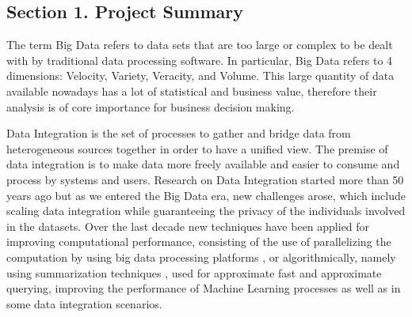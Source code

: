 \documentclass[12pt]{article}
\begin{document}


\subsection*{Section 1. Project Summary}
The term Big Data refers to data sets that are too large or complex to be dealt with by traditional data processing software. 
In particular, Big Data refers to 4 dimensions: Velocity, Variety, Veracity, and Volume. This large quantity of data available nowadays has 
a lot of statistical and business value, therefore their analysis is of core importance for business decision making.

Data Integration is the set of processes to gather and bridge data from heterogeneous sources together in order to 
have a unified view. The premise of data integration is to make data more freely available and easier 
to consume and process by systems and users.
Research on Data Integration started more than 50 years ago \cite*{recordLinkTheory,dataModelIntegration1980} but as we entered the Big Data era, new challenges arose,
 which include scaling \cite*{Dong2013} data integration while guaranteeing the privacy \cite*{yu2016big} of the individuals involved in the datasets.
Over the last decade new techniques have been applied for improving computational performance, consisting of the use of parallelizing the computation by using big data processing platforms \cite*{Dong2013},
 or algorithmically, namely using summarization techniques \cite*{Cormode2011}, used for 
approximate fast and approximate querying, improving the performance of Machine Learning processes \cite*{Gribonval2020, Antonanzas2021, Jiang2018} as well as in some data integration scenarios.
\end{document}
